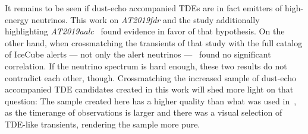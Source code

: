 It remains to be seen if dust-echo accompanied TDEs are in fact emitters of high-energy neutrinos. This work on \textit{AT2019fdr} and the study additionally highlighting \textit{AT2019aalc}~\cite{Velzen2021} found evidence in favor of that hypothesis. On the other hand, when crossmatching the transients of that study with the full catalog of IceCube alerts --- not only the alert neutrinos ---~ found no significant correlation. If the neutrino spectrum is hard enough, these two results do not contradict each other, though. Crossmatching the increased sample of dust-echo accompanied TDE candidates created in this work will shed more light on that question: The sample created here has a higher quality than what was used in~\cite{Velzen2021}, as the timerange of observations is larger and there was a visual selection of TDE-like transients, rendering the sample more pure.












